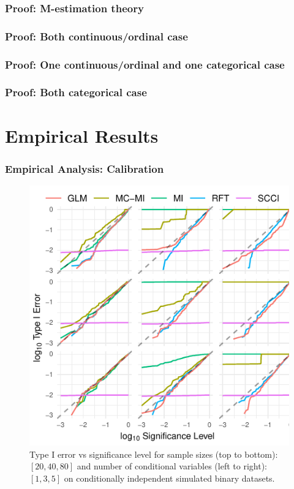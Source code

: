 \documentclass{beamer}
\begin{document}
\begin{frame}
	\frametitle{Proof: M-estimation theory}
\end{frame}

\begin{frame}
	\frametitle{Proof: Both continuous/ordinal case}
\end{frame}

\begin{frame}
	\frametitle{Proof: One continuous/ordinal and one categorical case}
\end{frame}

\begin{frame}
	\frametitle{Proof: Both categorical case}
\end{frame}

\section{Empirical Results}

\begin{frame}
	\frametitle{Empirical Analysis: Calibration}
	\begin{figure}
		\centering
		\includegraphics[scale=0.8]{imgs/calibration_add_vars.pdf}
		\caption*{Type I error vs significance level for sample sizes (top to
		bottom): $ [20, 40, 80] $ and number of conditional variables (left to
		right): $ [1, 3, 5] $ on conditionally independent simulated binary
		datasets.}
	\end{figure}
\end{frame}
\end{document}
